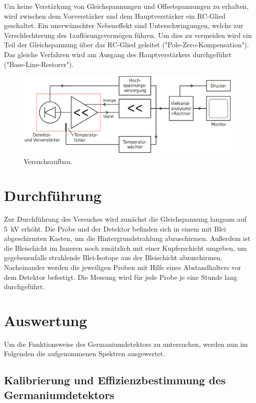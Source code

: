 Um keine Verstärkung von Gleichspannungen und Offsetspannungen zu erhalten, wird
zwischen dem Vorverstärker und dem Hauptverstärker ein RC-Glied geschaltet. Ein
unerwünschter Nebeneffekt sind Unterschwingungen, welche zur Verschlechterung
des 1auflösungsvermögen führen. Um dies zu vermeiden wird ein Teil der
Gleichspannung über das RC-Glied geleitet ("Pole-Zero-Kompensation"). Das gleiche
Verfahren wird am Ausgang des Hauptverstärkers durchgeführt
("Base-Line-Restorer").

\begin{figure}
  \centering
  \includegraphics[scale=0.4]{Aufbau.png}
  \caption{Versuchsaufbau. \cite{Q1}}
  \label{abb:2}
\end{figure}



\section{Durchführung}
Zur Durchführung des Versuches wird zunächst die Gleichspannung langsam auf \SI{5}{\kilo\volt}
erhöht.
Die Probe und der Detektor befinden sich in einem mit Blei abgeschirmten Kasten,
um die Hintergrundstrahlung abzuschirmen. Außerdem ist die Bleischicht im Inneren
noch zusätzlich mit einer Kupferschicht umgeben, um gegebenenfalls strahlende
Blei-Isotope aus der Bleischicht abzuschirmen.
Nacheinander werden die jeweiligen Proben mit Hilfe eines Abstandhalters
vor dem Detektor befestigt. Die Messung wird für jede Probe je eine Stunde lang
durchgeführt.

\section{Auswertung}
Um die Funktionsweise des Germaniumdetektors zu untersuchen, werden nun im Folgenden die aufgenommenen Spektren ausgewertet.

\subsection{Kalibrierung und Effizienzbestimmung des Germaniumdetektors}

